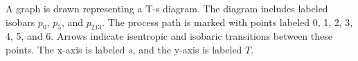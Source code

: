 A graph is drawn representing a T-s diagram. The diagram includes labeled isobars \( p_0 \), \( p_5 \), and \( p_{213} \). The process path is marked with points labeled 0, 1, 2, 3, 4, 5, and 6. Arrows indicate isentropic and isobaric transitions between these points. The x-axis is labeled \( s \), and the y-axis is labeled \( T \).